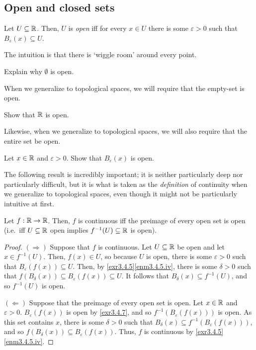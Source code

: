 \subsection{Open and closed sets}

\begin{dfn}
Let $U\subseteq \mathbb{R}$.  Then, $U$ is \emph{open} iff for every $x\in U$ there is some $\varepsilon >0$ such that $B_\varepsilon (x)\subseteq U$.
\begin{rmk}
The intuition is that there is `wiggle room' around every point.
\end{rmk}
\end{dfn}
\begin{exr}\label{exr3.4.13}
Explain why $\emptyset$ is open.
\begin{rmk}
When we generalize to topological spaces, we will require that the empty-set is open.
\end{rmk}
\end{exr}
\begin{exr}\label{exr3.4.14}
Show that $\mathbb{R}$ is open.
\begin{rmk}
Likewise, when we generalize to topological spaces, we will also require that the entire set be open.
\end{rmk}
\end{exr}
\begin{exr}\label{exr3.4.7}
Let $x\in \mathbb{R}$ and $\varepsilon >0$.  Show that $B_\varepsilon (x)$ is open.
\end{exr}
The following result is incredibly important; it is neither particularly deep nor particularly difficult, but it is what is taken as the \emph{definition} of continuity when we generalize to topological spaces, even though it might not be particularly intuitive at first.
\begin{thm}\label{thm3.4.16}
Let $f:\mathbb{R} \rightarrow \mathbb{R}$.  Then, $f$ is continuous iff the preimage of every open set is open (i.e.~iff $U\subseteq \mathbb{R}$ open implies $f^{-1}(U)\subseteq \mathbb{R}$ is open).
\begin{proof}
$(\Rightarrow )$ Suppose that $f$ is continuous.  Let $U\subseteq \mathbb{R}$ be open and let $x\in f^{-1}(U)$.  Then, $f(x)\in U$, so because $U$ is open, there is some $\varepsilon >0$ such that $B_\varepsilon (f(x))\subseteq U$.  Then, by \cref{exr3.4.5}\ref{enm3.4.5.iv}, there is some $\delta >0$ such that $f(B_\delta (x))\subseteq B_\varepsilon (f(x))\subseteq U$.  It follows that $B_\delta (x)\subseteq f^{-1}(U)$, and so $f^{-1}(U)$ is open.

\blankline
\noindent
$(\Leftarrow )$ Suppose that the preimage of every open set is open.  Let $x\in \mathbb{R}$ and $\varepsilon >0$.  $B_\varepsilon (f(x))$ is open by \cref{exr3.4.7}, and so $f^{-1}(B_\varepsilon (f(x)))$ is open.  As this set contains $x$, there is some $\delta >0$ such that $B_\delta (x)\subseteq f^{-1}(B_\varepsilon (f(x)))$, and so $f(B_\delta (x))\subseteq B_\varepsilon (f(x))$.  Thus, $f$ is continuous by \cref{exr3.4.5}\ref{enm3.4.5.iv}.
\end{proof}
\end{thm}

